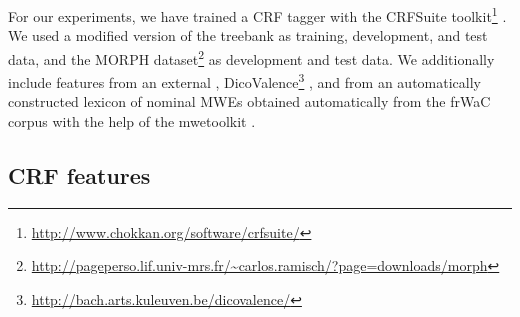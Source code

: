 \documentclass[output=paper,modfonts]{langscibook}
\begin{document}
For our experiments, we have trained a CRF tagger with the CRFSuite toolkit\footnote{\url{http://www.chokkan.org/software/crfsuite/}} \citep{CRFsuite}. We used a modified version of the  treebank \citep{abeille:2003:ftb} as training, development, and test data, and the MORPH dataset\footnote{\url{http://pageperso.lif.univ-mrs.fr/~carlos.ramisch/?page=downloads/morph}} \citep{nasr:acl:2015} as development and test data. We additionally include features from an external , DicoValence\footnote{\url{http://bach.arts.kuleuven.be/dicovalence/}} \citep{dicovalence}, and from an automatically constructed lexicon of nominal MWEs obtained automatically from the frWaC corpus \citep{wacky:2006} with the help of the mwetoolkit \citep{ramisch2014multiword}. 


\subsection{CRF features}
\label{subsec:crf-feat}
\end{document}
